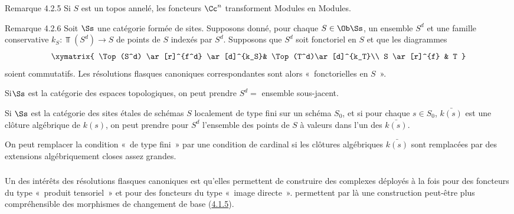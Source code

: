 \documentclass[10pt]{../fichiers-configuration-latex/smfart}
\begin{document}
\begin{enonce*}[remark]{Remarque 4.2.5}
Si $S$ est un topos annelé, les foncteurs $\Cc^{n}$
transforment Modules en Modules.
\end{enonce*}

\begin{enonce*}[remark]{Remarque 4.2.6}
Soit $\Ss$ une catégorie formée de sites. Supposons donné,
pour chaque $S\in \Ob \Ss$, un ensemble $S^{d}$ et une famille
conservative $k_{S}:\Top(S^{d})\rightarrow S$ de points de $S$ indexés
par $S^{d}$. Supposons que $S^{d}$ soit fonctoriel en $S$ et que les
diagrammes
\[
\xymatrix{
\Top(S^d)   \ar[r]^{f^d} \ar[d]^{k_S}& \Top(T^d)\ar[d]^{k_T}\\
S        \ar[r]^{f}  & T
}
\]
soient commutatifs. Les résolutions flasques canoniques
correspondantes sont alors « fonctorielles en $S$ ».
\end{enonce*}

Si\pageoriginale $\Ss$ est la catégorie des espaces
topologiques, on peut prendre $S^{d}=$ ensemble sous-jacent.

Si $\Ss$ est la catégorie des sites étales de schémas $S$
localement de type fini sur un schéma $S_{0}$, et si pour chaque
$s\in S_{0}$, $\bar{k(s)}$ est une clôture algébrique de $k(s)$,
on peut prendre pour $S^{d}$ l'ensemble des points de $S$ à valeurs
dans l'un des $\bar{k(s)}$.

On peut remplacer la condition « de type fini »  par une condition
de cardinal si les clôtures algébriques $\bar{k(s)}$ sont remplacées
par des extensions algébriquement closes assez grandes.

\setcounter{subsubsection}{6}
\subsubsection{}
Un des intérêts des résolutions flasques canoniques est qu'elles
permettent de construire des complexes déployés à la fois pour des
foncteurs du type « produit tensoriel »  et pour des foncteurs du
type « image directe ».  permettent par là une construction
peut-être plus compréhensible des morphismes de changement de base
(\hyperref[XVII.prop4.1.5]{4.1.5}).
\end{document}
